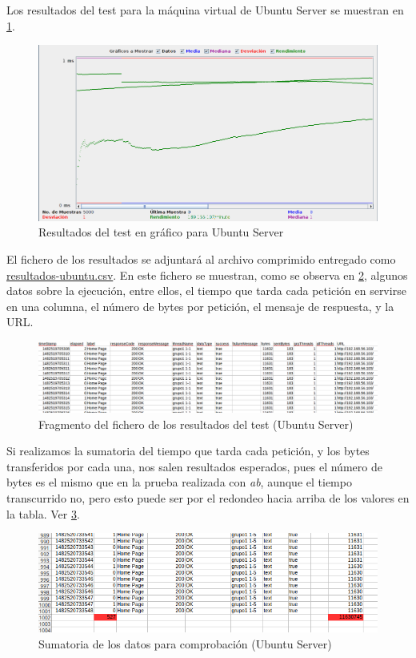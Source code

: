 Los resultados del test para la máquina virtual de Ubuntu Server se muestran en \ref{cuestion4-07}.

\begin{figure}[H]
	\centering
	\includegraphics[scale=0.4]{cuestion4-07.png}
	\caption{Resultados del test en gráfico para Ubuntu Server} \label{cuestion4-07}
\end{figure}

El fichero de los resultados se adjuntará al archivo comprimido entregado como \url{resultados-ubuntu.csv}. En este fichero se muestran, como se observa en \ref{cuestion4-08}, algunos datos sobre la ejecución, entre ellos, el tiempo que tarda cada petición en servirse en una columna, el número de bytes por petición, el mensaje de respuesta, y la URL.

\begin{figure}[H]
	\centering
	\includegraphics[scale=0.3]{cuestion4-08.png}
	\caption{Fragmento del fichero de los resultados del test (Ubuntu Server)} \label{cuestion4-08}
\end{figure}

Si realizamos la sumatoria del tiempo que tarda cada petición, y los bytes transferidos por cada una, nos salen resultados esperados, pues el número de bytes es el mismo que en la prueba realizada con \textit{ab}, aunque el tiempo transcurrido no, pero esto puede ser por el redondeo hacia arriba de los valores en la tabla. Ver \ref{cuestion4-09}.

\begin{figure}[H]
	\centering
	\includegraphics[scale=0.3]{cuestion4-09.png}
	\caption{Sumatoria de los datos para comprobación (Ubuntu Server)} \label{cuestion4-09}
\end{figure}

